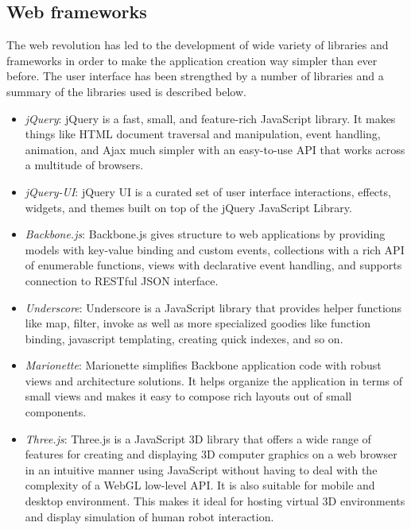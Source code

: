 \subsection{Web frameworks}
The web revolution has led to the development of wide variety of libraries and frameworks in order to make the application creation way simpler than ever before. The user interface has been strengthed by a number of libraries and a summary of the libraries used is described below.
\begin{itemize}[leftmargin={1cm},topsep={0pt},itemsep={0pt},partopsep={0pt},parsep={0pt}] 
\item \emph{jQuery}: jQuery is a fast, small, and feature-rich JavaScript library. It makes things like HTML document traversal and manipulation, event handling, animation, and Ajax much simpler with an easy-to-use API that works across a multitude of browsers. 
\item \emph{jQuery-UI}: jQuery UI is a curated set of user interface interactions, effects, widgets, and themes built on top of the jQuery JavaScript Library. 
\item \emph{Backbone.js}: Backbone.js gives structure to web applications by providing models with key-value binding and custom events, collections with a rich API of enumerable functions, views with declarative event handling, and supports connection to RESTful JSON interface.
\item \emph{Underscore}: Underscore is a JavaScript library that provides helper functions like map, filter, invoke as well as more specialized goodies like function binding, javascript templating, creating quick indexes, and so on.
\item \emph{Marionette}: Marionette simplifies Backbone application code with robust views and architecture solutions. It helps organize the application in terms of small views and makes it easy to compose rich layouts out of small components.
\item \emph{Three.js}: Three.js is a JavaScript 3D library that offers a wide range of features for creating and displaying 3D computer graphics on a web browser in an intuitive manner using JavaScript without having to deal with the complexity of a WebGL low-level API. It is also suitable for mobile and desktop environment. This makes it ideal for hosting virtual 3D environments and display simulation of human robot interaction.
\end{itemize}
